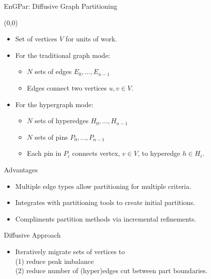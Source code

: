 \documentclass{beamer}
\begin{document}
\begin{textblock}{15.6}
\begin{textblock}{5.1}
\begin{block}{\centering EnGPar: Diffusive Graph Partitioning}
\begin{textblock}{2.5}
      \end{textblock}
      \begin{textblock}{2.9}(0,0)
      \begin{itemize}
      \item Set of vertices $V$ for units of work.
      \item For the traditional graph mode:
        \begin{itemize}
        \item $N$ sets of edges $E_0,...,E_{n-1}$ 
        \item Edges connect two vertices $u,v \in V$.
        \end{itemize}
      \item For the hypergraph mode:
        \begin{itemize}
        \item $N$ sets of hyperedges $H_0,...,H_{n-1}$ 
        \item $N$ sets of pins $P_0,...,P_{n-1}$ 
        \item Each pin in $P_i$ connects vertex, $v \in V$, to hyperedge $h \in H_i$.
        \end{itemize}
      \end{itemize}
      \vspace{-.3cm}
      Advantages
      \vspace{-.1cm}
      \begin{itemize}
      \item Multiple edge types allow partitioning for multiple criteria.
      \item Integrates with partitioning tools to create initial partitions.
      \item Compliments partition methods via incremental refinements.
      \end{itemize}
      \vspace{-.25cm}
      Diffusive Approach
      \vspace{-.15cm}
      \begin{itemize}
      \item Iteratively migrate sets of vertices to \\(1) reduce peak imbalance \\(2) reduce number of (hyper)edges cut between part boundaries.
      \end{itemize}
      \end{textblock}
      \vspace{29.5cm}
      

\end{block}
\end{textblock}
\end{textblock}
\end{document}
